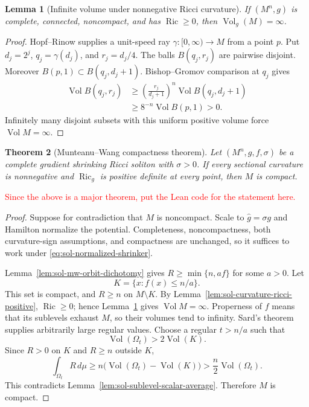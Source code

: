 \documentclass[10pt]{coll-l}
\newtheorem{theorem}{Theorem}[chapter]
\newtheorem{lemma}[theorem]{Lemma}
\theoremstyle{definition}
\theoremstyle{remark}
\numberwithin{section}{chapter}
\numberwithin{equation}{chapter}
\newcommand{\Ric}{\operatorname{Ric}}
\newcommand{\Vol}{\operatorname{Vol}}
\begin{document}
\begin{lemma}[Infinite volume under nonnegative Ricci curvature]
\label{lem:sol-nonnegative-ricci-infinite-volume}
If $(M^n,g)$ is complete, connected, noncompact, and has $\Ric\geq0$, then
$\Vol_g(M)=\infty$.
\end{lemma}

\begin{proof}
Hopf--Rinow supplies a unit-speed ray $\gamma:[0,\infty)\to M$ from a
point $p$.  Put $d_j=2^j$, $q_j=\gamma(d_j)$, and $r_j=d_j/4$.  The balls
$B(q_j,r_j)$ are pairwise disjoint.  Moreover
$B(p,1)\subset B(q_j,d_j+1)$.  Bishop--Gromov comparison at $q_j$ gives
\begin{align*}
 \Vol B(q_j,r_j)
 &\geq\left(\frac{r_j}{d_j+1}\right)^n
          \Vol B(q_j,d_j+1)\\
 &\geq8^{-n}\Vol B(p,1)>0.
\end{align*}
Infinitely many disjoint subsets with this uniform positive volume force
$\Vol M=\infty$.
\end{proof}

\begin{theorem}[Munteanu--Wang compactness theorem]
\label{thm:sol-mw}
Let $(M^n,g,f,\sigma)$ be a complete gradient shrinking Ricci soliton with
$\sigma>0$.  If every sectional curvature is nonnegative and $\Ric_g$ is
positive definite at every point, then $M$ is compact.
\end{theorem}

\textcolor{red}{Since the above is a major theorem, put the Lean code for the statement here.}

\begin{proof}
Suppose for contradiction that $M$ is noncompact.  Scale to
$\widehat g=\sigma g$ and Hamilton normalize the potential.  Completeness,
noncompactness, both curvature-sign assumptions, and compactness are
unchanged, so it suffices to work under
\eqref{eq:sol-normalized-shrinker}.

Lemma~\ref{lem:sol-mw-orbit-dichotomy} gives
$R\geq\min\{n,af\}$ for some $a>0$.  Let
\[
                    K=\{x:f(x)\leq n/a\}.
\]
This set is compact, and $R\geq n$ on $M\setminus K$.  By
Lemma~\ref{lem:sol-curvature-ricci-positive}, $\Ric\geq0$; hence
Lemma~\ref{lem:sol-nonnegative-ricci-infinite-volume} gives
$\Vol M=\infty$.  Properness of $f$ means that its sublevels exhaust $M$, so
their volumes tend to infinity.  Sard's theorem supplies arbitrarily large
regular values.  Choose a regular $t>n/a$ such that
\[
                   \Vol(\Omega_t)>2\Vol(K).
\]
Since $R>0$ on $K$ and $R\geq n$ outside $K$,
\[
 \int_{\Omega_t}R\,d\mu
  \geq n\bigl(\Vol(\Omega_t)-\Vol(K)\bigr)
  >\frac n2\Vol(\Omega_t).
\]
This contradicts Lemma~\ref{lem:sol-sublevel-scalar-average}.
Therefore $M$ is compact.
\end{proof}
\end{document}

